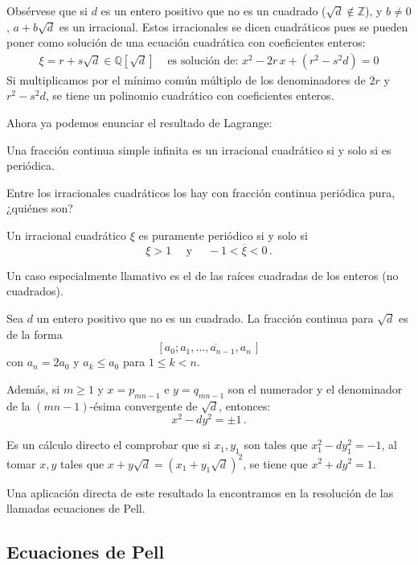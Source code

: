 Obsérvese que si $d$ es un entero positivo que no es un cuadrado ($\sqrt d\notin\mathbb Z$), y $b\neq0$, $a+b\sqrt d$ es un irracional. Estos irracionales se dicen cuadráticos pues se pueden poner como solución de una ecuación cuadrática con coeficientes enteros:
\begin{align*}
\xi=r+s\sqrt d\in\mathbb Q[\sqrt d] &
\text{ es solución de: } x^2-2r\,x+(r^2-s^2d)=0
\end{align*}
Si multiplicamos por el mínimo común múltiplo de los denominadores de $2r$ y $r^2-s^2d$, se tiene un polinomio cuadrático con coeficientes enteros.

Ahora ya podemos enunciar el resultado de Lagrange:

\begin{Tma}[Lagrange] Una fracción continua simple infinita es un irracional cuadrático si y solo si es periódica.
\end{Tma}

Entre los irracionales cuadráticos los hay con fracción continua periódica pura, ¿quiénes son?

\begin{Tma}[Galois]
	Un irracional cuadrático $\xi$ es puramente periódico si y solo si 
	$$\xi>1\quad\text{ y }\quad -1<\overline\xi<0\,.$$
\end{Tma}

Un caso especialmente llamativo es el de las raíces cuadradas de los enteros (no cuadrados). 

\begin{Tma}\label{Tma-Raizd} %
	Sea $d$ un entero positivo que no es un cuadrado. La fracción continua para $\sqrt d$ es de la forma
	$$
	[a_0;\overline{a_1,\dots,a_{n-1},a_n}\,]
	$$
	con $a_n=2a_0$ y $a_k\le a_0$ para $1\le k< n$.
	
	Además, si $m\ge 1$ y $x=p_{mn-1}$ e $y=q_{mn-1}$ son el numerador y el denominador de la $(mn-1)$-ésima convergente de $\sqrt d$, entonces:
	$$
	x^2-dy^2=\pm 1\,.
	$$
\end{Tma}

 Es un cálculo directo el comprobar que si $x_1, y_1$ son tales que $x_1^2-dy_1^2=-1$, al tomar $x, y$ tales que $x+y\sqrt d=(x_1+y_1\sqrt d)^2$, se tiene que $x^2+dy^2=1$.

Una aplicación directa de este resultado la encontramos en la resolución de las llamadas ecuaciones de Pell.

\subsection{Ecuaciones de Pell}

